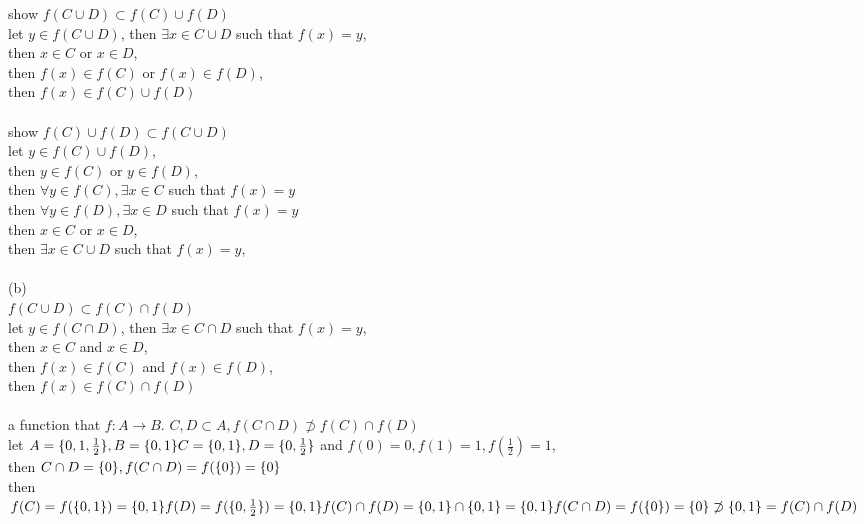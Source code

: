 \documentclass[12pt, border = 4pt, multi]{article} %
\begin{document}
show $f(C \cup D) \subset f(C) \cup f(D)$\\
let $y \in f(C \cup D)$, then $\exists x \in C \cup D$ such that $f(x) = y$,\\
then $x \in C$ or $x \in D$,\\
then $f(x) \in f(C)$ or $f(x) \in f(D)$,\\
then $f(x) \in f(C) \cup f(D)$\\
\\
show $f(C) \cup f(D) \subset f(C \cup D)$\\
let $y \in f(C) \cup f(D)$,\\
then $y \in f(C)$ or $y \in f(D)$,\\
then $\forall y \in f(C), \exists x \in C$ such that $f(x) = y$\\
then $\forall y \in f(D), \exists x \in D$ such that $f(x) = y$\\
then $x \in C$ or $x \in D$,\\
then $\exists x \in C \cup D$ such that $f(x) = y$,\\
\\
(b)\\
$f(C \cup D) \subset f(C) \cap f(D)$\\
let $y \in f(C \cap D)$, then $\exists x \in C \cap D$ such that $f(x) = y$,\\
then $x \in C$ and $x \in D$,\\
then $f(x) \in f(C)$ and $f(x) \in f(D)$,\\
then $f(x) \in f(C) \cap f(D)$\\
\\
a function that $f: A \rightarrow B$. $C, D \subset A, f(C \cap D) \not\supset f(C) \cap f(D)$\\
let $A = \{0, 1, \frac{1}{2}\}, B = \{0, 1\}\\
C = \{0, 1\}, D = \{0, \frac{1}{2}\}$ and $f(0) = 0, f(1) = 1, f(\frac{1}{2}) = 1$,\\
then $C \cap D = \{0\},\\
f(C \cap D) = f(\{0\}) = \{0\}$\\
then $f(C) = f(\{0, 1\}) = \{0, 1\}\\
f(D) = f(\{0, \frac{1}{2}\}) = \{0, 1\}\\
f(C) \cap f(D) = \{0, 1\} \cap \{0, 1\} = \{0, 1\}\\
f(C \cap D) = f(\{0\}) = \{0\} \not\supset \{0, 1\} = f(C) \cap f(D)$\\
\\
\\
\\
\end{document}
